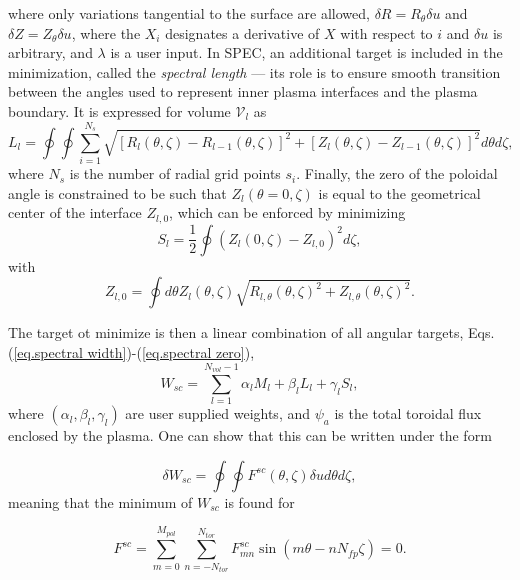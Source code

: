 where only variations tangential to the surface are allowed, $\delta R = R_\theta\delta u$ and $\delta Z = Z_\theta\delta u$, where the $X_i$ designates a derivative of $X$ with respect to $i$ and $\delta u$ is arbitrary, and $\lambda$ is a user input. In SPEC, an additional target is included in the minimization, called the \emph{spectral length} --- its role is to ensure smooth transition between the angles used to represent inner plasma interfaces and the plasma boundary. It is expressed for volume $\mathcal{V}_l$ as 
\begin{equation}
	L_l = \oint\oint\sum_{i=1}^{N_s}\sqrt{[R_l(\theta,\zeta)-R_{l-1}(\theta,\zeta)]^2 +  [Z_l(\theta,\zeta)-Z_{l-1}(\theta,\zeta)]^2}d\theta d\zeta, \label{eq.spectral length}
\end{equation}
where $N_s$ is the number of radial grid points $s_i$. Finally, the zero of the poloidal angle is constrained to be such that ${Z}_l(\theta=0,\zeta)$ is equal to the geometrical center of the interface $Z_{l,0}$, which can be enforced by minimizing
\begin{equation}
	S_l = \frac{1}{2}\oint ({Z}_l(0,\zeta) - Z_{l,0})^2 d\zeta, \label{eq.spectral zero}
\end{equation}
with
\begin{equation}
	Z_{l,0} = \oint d\theta Z_l(\theta,\zeta)\sqrt{R_{l,\theta}(\theta,\zeta)^2 + Z_{l,\theta}(\theta,\zeta)^2}.
\end{equation}

The target ot minimize is then a linear combination of all angular targets, Eqs.(\ref{eq.spectral width})-(\ref{eq.spectral zero}),
\begin{equation}
	W_{sc} = \sum_{l=1}^{N_{vol}-1} \alpha_lM_l + \beta_lL_l + \gamma_l S_l,
\end{equation}
where $(\alpha_l,\beta_l,\gamma_l)$ are user supplied weights, and $\psi_a$ is the total toroidal flux enclosed by the plasma. One can show that this can be written under the form

\begin{equation}
	\delta W_{sc} = \oint\oint F^{sc}(\theta,\zeta) \delta u d\theta d\zeta,
\end{equation}
meaning that the minimum of $W_{sc}$ is found for 

\begin{equation}
	F^{sc} = \sum_{m=0}^{M_{pol}} \sum_{n=-N_{tor}}^{N_{tor}} F^{sc}_{mn} \sin(m\theta-nN_{fp}\zeta) = 0. \label{eq. spectral constraint}
\end{equation}


